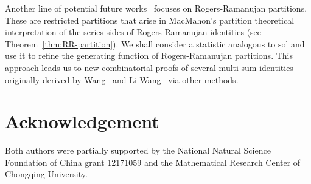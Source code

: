 \documentclass[11pt,reqno]{amsart}
\numberwithin{equation}{section}
\theoremstyle{plain}
\theoremstyle{definition}
\def\sol{\mathrm{sol}}
\begin{document}
Another line of potential future works~\cite{FL25} focuses on Rogers-Ramanujan partitions. These are restricted partitions that arise in MacMahon's partition theoretical interpretation of the series sides of Rogers-Ramanujan identities (see Theorem~\ref{thm:RR-partition}). We shall consider a statistic analogous to $\sol$ and use it to refine the generating function of Rogers-Ramanujan partitions. This approach leads us to new combinatorial proofs of several multi-sum identities originally derived by Wang~\cite{wan22} and Li-Wang~\cite{LW23} via other methods.











\section*{Acknowledgement}
Both authors were partially supported by the National Natural Science Foundation of China grant 12171059 and the Mathematical Research Center of Chongqing University.
\end{document}
